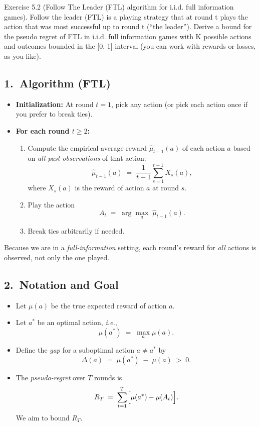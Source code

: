 Exercise 5.2 (Follow The Leader (FTL) algorithm for i.i.d. full information games). Follow the leader
(FTL) is a playing strategy that at round t plays the action that was most successful up to round t (“the
leader”). Derive a bound for the pseudo regret of FTL in i.i.d. full information games with K possible
actions and outcomes bounded in the [0, 1] interval (you can work with rewards or losses, as you like).

\subsection*{1.\ Algorithm (FTL)}

\begin{itemize}
\item \textbf{Initialization:} At round $t=1$, pick any action (or pick each action once if you prefer to break ties).
\item \textbf{For each round $t \ge 2$:}
  \begin{enumerate}
  \item Compute the empirical average reward \(\hat{\mu}_{t-1}(a)\) of each action \(a\) based on \emph{all past observations} of that action:
  \[
    \hat{\mu}_{t-1}(a)
    \;=\;
    \frac{1}{t-1} \sum_{s=1}^{t-1} X_s(a),
  \]
  where \(X_s(a)\) is the reward of action \(a\) at round $s$.  
  \item Play the action
  \[
    A_t \;=\; \arg\max_{a} \; \hat{\mu}_{t-1}(a).
  \]
  \item Break ties arbitrarily if needed.
  \end{enumerate}
\end{itemize}

Because we are in a \emph{full-information} setting, each round's reward for \emph{all} actions is observed, not only the one played.

\subsection*{2.\ Notation and Goal}

\begin{itemize}
\item Let $\mu(a)$ be the true expected reward of action $a$.
\item Let $a^*$ be an optimal action, \emph{i.e.},
  \[
    \mu(a^*) \;=\; \max_{a} \mu(a).
  \]
\item Define the \emph{gap} for a suboptimal action \(a\neq a^*\) by
  \[
    \Delta(a) \;=\; \mu(a^*) \;-\; \mu(a) \;>\; 0.
  \]
\item The \emph{pseudo-regret} over $T$ rounds is
  \[
    R_T
    \;=\;
    \sum_{t=1}^T \Bigl[\mu(a^*) - \mu(A_t)\Bigr].
  \]
  We aim to bound $R_T$.
\end{itemize}

